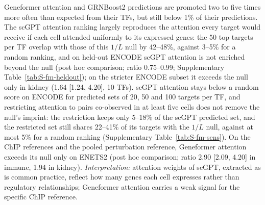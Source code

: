 \documentclass[11pt,a4paper]{article}
\begin{document}
Geneformer attention and GRNBoost2 predictions are promoted two to five times more often than expected from their TFs, but still below 1\% of their predictions.
The scGPT attention ranking largely reproduces the attention every target would receive if each cell attended uniformly to its expressed genes: the 50 top targets per TF overlap with those of this $1/L$ null by 42--48\%, against 3--5\% for a random ranking, and on held-out ENCODE scGPT attention is not enriched beyond the null (post hoc comparison; ratio 0.75--0.99; Supplementary Table~\ref{tab:S-fm-heldout}); on the stricter ENCODE subset it exceeds the null only in kidney (1.64 [1.24, 4.20], 10 TFs).
scGPT attention stays below a random score on ENCODE for predicted sets of 20, 50 and 100 targets per TF, and restricting attention to pairs co-observed in at least five cells does not remove the null's imprint: the restriction keeps only 5--18\% of the scGPT predicted set, and the restricted set still shares 22--41\% of its targets with the $1/L$ null, against at most 5\% for a random ranking (Supplementary Table~\ref{tab:S-fm-sens}).
On the ChIP references and the pooled perturbation reference, Geneformer attention exceeds its null only on ENETS2 (post hoc comparison; ratio 2.90 [2.09, 4.20] in immune, 1.94 in kidney).
\emph{Interpretation:} attention weights of scGPT, extracted as is common practice, reflect how many genes each cell expresses rather than regulatory relationships; Geneformer attention carries a weak signal for the specific ChIP reference.
\end{document}
